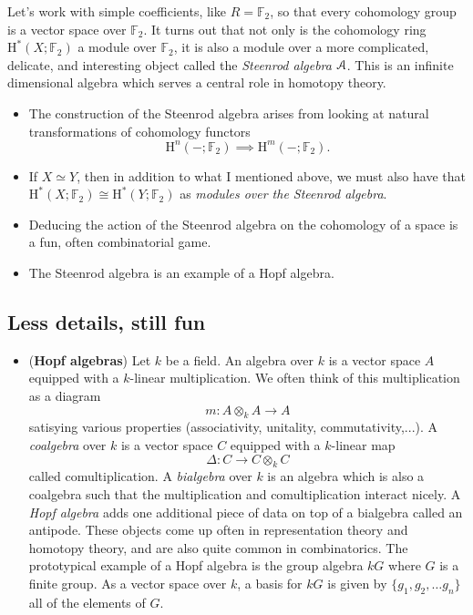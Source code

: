 \documentclass[10pt]{amsart}
\newcommand{\euscr}[1]{\EuScript{#1}}
\theoremstyle{definition}
\newcommand{\cdef}[1]{\textcolor{Bittersweet}{#1}}
\begin{document}
Let's work with simple coefficients, like $R=\mathbb{F}_2$, so that every cohomology group is a vector space over $\mathbb{F}_2$. It turns out that not only is the cohomology ring $\text{H}^*(X; \mathbb{F}_2)$ a module over $\mathbb{F}_2$, it is also a module over a more complicated, delicate, and interesting object called the \cdef{\emph{Steenrod algebra}} $\euscr{A}$. This is an infinite dimensional algebra which serves a central role in homotopy theory.
\begin{itemize}
    \item The construction of the Steenrod algebra arises from looking at natural transformations of cohomology functors
    \[
    \text{H}^n(-; \mathbb{F}_2) \implies \text{H}^m(-; \mathbb{F}_2).
    \]
    \item If $X \simeq Y$, then in addition to what I mentioned above, we must also have that $\text{H}^*(X; \mathbb{F}_2) \cong \text{H}^*(Y; \mathbb{F}_2)$ as \emph{modules over the Steenrod algebra}.
    \item Deducing the action of the Steenrod algebra on the cohomology of a space is a fun, often combinatorial game.
    \item The Steenrod algebra is an example of a Hopf algebra.
\end{itemize}

\subsection*{Less details, still fun}
\begin{itemize}
    \item (\textbf{Hopf algebras}) Let $k$ be a field. An algebra over $k$ is a vector space $A$ equipped with a $k$-linear multiplication.
    We often think of this multiplication as a diagram
    \[
    m:A \otimes_k A \to A
    \]
    satisying various properties (associativity, unitality, commutativity,...).
    A \emph{coalgebra} over $k$ is a vector space $C$ equipped with a $k$-linear map
    \[
    \Delta:C \to C \otimes _k C
    \]
    called comultiplication.
    A \emph{bialgebra} over $k$ is an algebra which is also a coalgebra such that the multiplication and comultiplication interact nicely.
    A \cdef{\emph{Hopf algebra}} adds one additional piece of data on top of a bialgebra called an antipode.
    These objects come up often in representation theory and homotopy theory, and are also quite common in combinatorics.
    The prototypical example of a Hopf algebra is the group algebra $kG$ where $G$ is a finite group.
    As a vector space over $k$, a basis for $kG$ is given by $\{g_1, g_2, \dots g_n\}$ all of the elements of $G$. 

\end{itemize}
\end{document}
